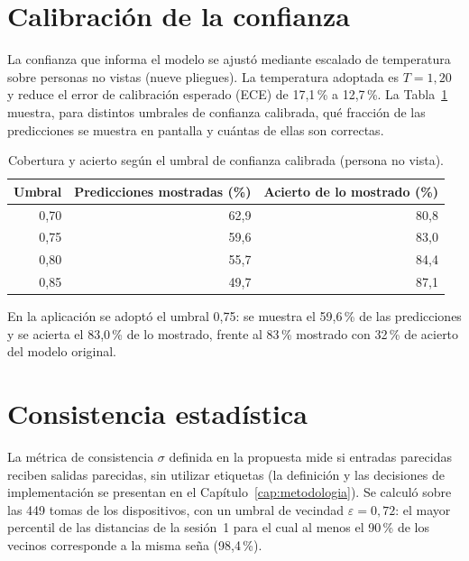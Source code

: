\section{Calibración de la confianza}
\label{sec:res-calibracion}

La confianza que informa el modelo se ajustó mediante escalado de temperatura sobre personas no vistas (nueve pliegues). La temperatura adoptada es $T = 1{,}20$ y reduce el error de calibración esperado (ECE) de 17,1\,\% a 12,7\,\%. La Tabla~\ref{tab:umbral} muestra, para distintos umbrales de confianza calibrada, qué fracción de las predicciones se muestra en pantalla y cuántas de ellas son correctas.

\begin{table}[h]
    \centering
    \begin{tabular}{rrr}
        \toprule
        Umbral & Predicciones mostradas (\%) & Acierto de lo mostrado (\%) \\
        \midrule
        0,70 & 62,9 & 80,8 \\
        0,75 & 59,6 & 83,0 \\
        0,80 & 55,7 & 84,4 \\
        0,85 & 49,7 & 87,1 \\
        \bottomrule
    \end{tabular}
    \caption{Cobertura y acierto según el umbral de confianza calibrada (persona no vista).}
    \label{tab:umbral}
\end{table}

En la aplicación se adoptó el umbral 0,75: se muestra el 59,6\,\% de las predicciones y se acierta el 83,0\,\% de lo mostrado, frente al 83\,\% mostrado con 32\,\% de acierto del modelo original.

\section{Consistencia estadística}
\label{sec:res-consistencia}

La métrica de consistencia $\sigma$ definida en la propuesta mide si entradas parecidas reciben salidas parecidas, sin utilizar etiquetas (la definición y las decisiones de implementación se presentan en el Capítulo~\ref{cap:metodologia}). Se calculó sobre las 449 tomas de los dispositivos, con un umbral de vecindad $\varepsilon = 0{,}72$: el mayor percentil de las distancias de la sesión~1 para el cual al menos el 90\,\% de los vecinos corresponde a la misma seña (98,4\,\%).


